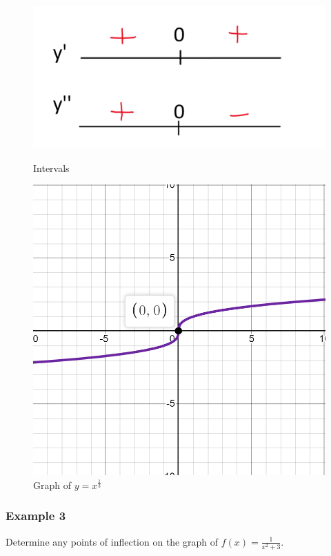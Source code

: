 \documentclass{article}
\begin{document}
\begin{figure}[h]
    \centering
    \begin{minipage}{0.5\textwidth}
        \centering
        \includegraphics[width=\textwidth]{imgs/alg 2.png}
        \caption{Intervals}
        \label{fig:alg1}
    \end{minipage}%
    \begin{minipage}{0.5\textwidth}
        \centering
        \includegraphics[width=\textwidth]{imgs/y=x^1.png}
        \caption{Graph of $y=x^{\frac{1}{3}}$}
        \label{fig:graph}
    \end{minipage}
\end{figure}
\newpage 
\subsubsection*{Example 3}
Determine any points of inflection on the graph of $f(x)=\frac{1}{x^2+3}$.
\end{document}

